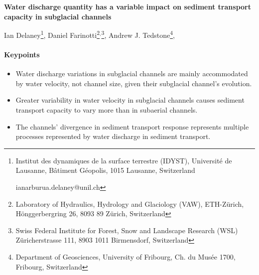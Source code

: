 \documentclass[11pt]{article}
\begin{document}
% 
% 


\begin{center}
  \Large{\textbf{Water discharge quantity has a variable impact on sediment transport capacity in subglacial channels}}
  \normalsize

  Ian Delaney\footnote{Institut des dynamiques de la surface terrestre (IDYST), Universit\'{e} de Lausanne, B\^{a}timent G\'{e}opolis, 1015 Lausanne, Switzerland 

    ianarburua.delaney@unil.ch},
  Daniel Farinotti\footnote{Laboratory of Hydraulics, Hydrology and Glaciology (VAW), ETH-Z\"urich, H\"onggerbergring 26, 8093 89 Z\"urich, Switzerland}$^{,}$\footnote{Swiss Federal Institute for Forest, Snow and Landscape Research (WSL) Z\"uricherstrasse 111, 8903 1011 Birmensdorf, Switzerland},
  Andrew J. Tedstone\footnote{Department of Geosciences, University of Fribourg, Ch. du Musée 1700, Fribourg, Switzerland},

  

\end{center}
\paragraph{Keypoints}
\begin{itemize}
\item Water discharge variations in subglacial channels are mainly accommodated by water velocity, not channel size, given their subglacial channel's evolution.

\item Greater variability in water velocity in subglacial channels causes sediment transport capacity to vary more than in subaerial channels.

\item The channels' divergence in sediment transport response represents multiple processes represented by water discharge in sediment transport.
\end{itemize}
\end{document}
